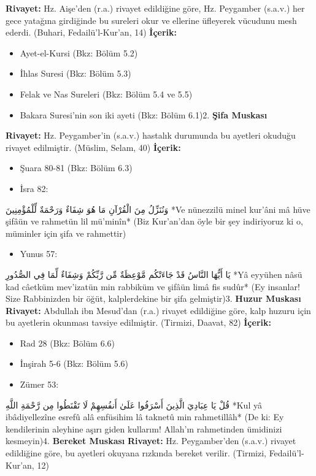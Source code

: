 \documentclass[12pt,a4paper]{article}
\begin{document}
\textbf{Rivayet:} Hz. Aişe'den (r.a.) rivayet edildiğine göre, Hz. Peygamber (s.a.v.) her gece yatağına girdiğinde bu sureleri okur ve ellerine üfleyerek vücudunu mesh ederdi. (Buhari, Fedailü'l-Kur'an, 14)
\textbf{İçerik:}
\begin{itemize}
\item Ayet-el-Kursi (Bkz: Bölüm 5.2)
\item İhlas Suresi (Bkz: Bölüm 5.3)
\item Felak ve Nas Sureleri (Bkz: Bölüm 5.4 ve 5.5)
\item Bakara Suresi'nin son iki ayeti (Bkz: Bölüm 6.1)2. \textbf{Şifa Muskası}
\end{itemize}
\textbf{Rivayet:} Hz. Peygamber'in (s.a.v.) hastalık durumunda bu ayetleri okuduğu rivayet edilmiştir. (Müslim, Selam, 40)
\textbf{İçerik:}
\begin{itemize}
\item Şuara 80-81 (Bkz: Bölüm 6.3)
\item İsra 82:
\end{itemize}
وَنُنَزِّلُ مِنَ الْقُرْآنِ مَا هُوَ شِفَاءٌ وَرَحْمَةٌ لِّلْمُؤْمِنِينَ
*Ve nünezzilü minel kur'âni mâ hüve şifâün ve rahmetün lil mü'minîn*
(Biz Kur'an'dan öyle bir şey indiriyoruz ki o, müminler için şifa ve rahmettir)
\begin{itemize}
\item Yunus 57:
\end{itemize}
يَا أَيُّهَا النَّاسُ قَدْ جَاءَتْكُم مَّوْعِظَةٌ مِّن رَّبِّكُمْ وَشِفَاءٌ لِّمَا فِي الصُّدُورِ
*Yâ eyyühen nâsü kad câetküm mev'izatün min rabbiküm ve şifâün limâ fis sudûr*
(Ey insanlar! Size Rabbinizden bir öğüt, kalplerdekine bir şifa gelmiştir)3. \textbf{Huzur Muskası}
\textbf{Rivayet:} Abdullah ibn Mesud'dan (r.a.) rivayet edildiğine göre, kalp huzuru için bu ayetlerin okunması tavsiye edilmiştir. (Tirmizi, Daavat, 82)
\textbf{İçerik:}
\begin{itemize}
\item Rad 28 (Bkz: Bölüm 6.6)
\item İnşirah 5-6 (Bkz: Bölüm 5.6)
\item Zümer 53:
\end{itemize}
قُلْ يَا عِبَادِيَ الَّذِينَ أَسْرَفُوا عَلَىٰ أَنفُسِهِمْ لَا تَقْنَطُوا مِن رَّحْمَةِ اللَّهِ
*Kul yâ ibâdiyellezîne esrefû alâ enfüsihim lâ taknetû min rahmetillâh*
(De ki: Ey kendilerinin aleyhine aşırı giden kullarım! Allah'ın rahmetinden ümidinizi kesmeyin)4. \textbf{Bereket Muskası}
\textbf{Rivayet:} Hz. Peygamber'den (s.a.v.) rivayet edildiğine göre, bu ayetleri okuyana rızkında bereket verilir. (Tirmizi, Fedailü'l-Kur'an, 12)
\end{document}
